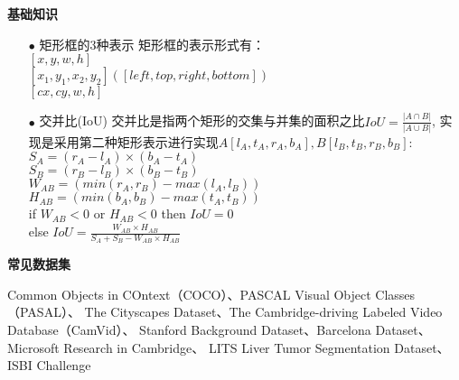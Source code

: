 \begin{frame}
    \noindent\large\textbf{基础知识}
    \begin{itemize}
        \item[$ \bullet $] 矩形框的3种表示
            矩形框的表示形式有：\\
            $[x,y,w,h]$ \\
            $[x_1,y_1,x_2,y_2]([left,top,right,bottom])$\\
            $[cx,cy,w,h]$
        \item[$ \bullet $] 交并比(IoU)
            交并比是指两个矩形的交集与并集的面积之比$IoU=\frac{|A\cap B|}{|A\cup B|}$,
            实现是采用第二种矩形表示进行实现$A[l_A,t_A,r_A,b_A],B[l_B,t_B,r_B,b_B]$:\\

            $S_A=(r_A-l_A)\times(b_A-t_A)$\\
            $S_B=(r_B-l_B)\times(b_B-t_B)$\\
            $W_{AB}=(min(r_A,r_B)-max(l_A,l_B))$\\
            $H_{AB}=(min(b_A,b_B)-max(t_A,t_B))$\\
            if $ W_{AB}<0$ or $H_{AB}<0$ then $IoU = 0$\\
            else $IoU=\frac{W_{AB}\times H_{AB}}{S_A+S_B-W_{AB}\times H_{AB}}$

    \end{itemize}
\end{frame}


\begin{frame}
    \noindent\large\textbf{常见数据集}


    \vspace{1em} \small
    Common Objects in COntext（COCO）、PASCAL Visual Object Classes（PASAL）、
    The Cityscapes Dataset、The Cambridge-driving Labeled Video Database（CamVid）、
    Stanford Background Dataset、Barcelona Dataset、Microsoft Research in Cambridge、
    LITS Liver Tumor Segmentation Dataset、ISBI Challenge
\end{frame}



